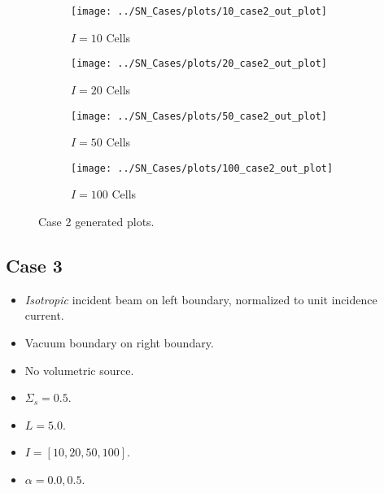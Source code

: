 \documentclass{NE515}
\theoremstyle{definition}
\begin{document}
    \begin{figure}
        \centering
        \begin{subfigure}{0.45\linewidth}
            \centering
            \texttt{[image: ../SN\_Cases/plots/10\_case2\_out\_plot]}
            \caption{$I=10$ Cells}
        \end{subfigure}
        \hfill
        \begin{subfigure}{0.45\linewidth}
            \centering
            \texttt{[image: ../SN\_Cases/plots/20\_case2\_out\_plot]}
            \caption{$I=20$ Cells}
        \end{subfigure}
        \hfill
        \begin{subfigure}{0.45\linewidth}
            \centering
            \texttt{[image: ../SN\_Cases/plots/50\_case2\_out\_plot]}
            \caption{$I=50$ Cells}
        \end{subfigure}
        \hfill
        \begin{subfigure}{0.45\linewidth}
            \centering
            \texttt{[image: ../SN\_Cases/plots/100\_case2\_out\_plot]}
            \caption{$I=100$ Cells}
        \end{subfigure}

        \caption{Case 2 generated plots.}
        \label{fig:case-2}
    \end{figure}
    \clearpage

    \subsection{Case 3}
    \begin{itemize}
        \item \textit{Isotropic} incident beam on left boundary, normalized to unit incidence current.
        \item Vacuum boundary on right boundary.
        \item No volumetric source.
        \item $\Sigma_s=0.5$.
        \item $L=5.0$.
        \item $I=[10,20,50,100]$.
        \item $\alpha=0.0, 0.5$.
    \end{itemize}
\end{document}

